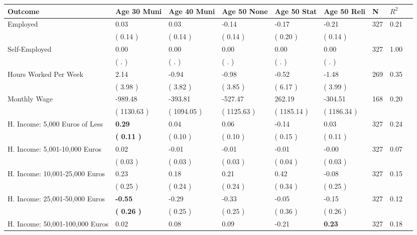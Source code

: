 \begin{tabular}{L{6.2cm} C{1.8cm} C{1.8cm} C{1.8cm} C{1.8cm} C{1.8cm} C{1.8cm} C{0.3cm} C{0.3cm}}
\toprule
 \textbf{Outcome} & \textbf{Age 30 Muni} & \textbf{Age 40 Muni} & \textbf{Age 50 None} & \textbf{Age 50 Stat} & \textbf{Age 50 Reli} & \textbf{N} & \textbf{$ R^2$} \\
\midrule
Employed &      0.03 &      0.03 &     -0.14 &     -0.17 &     -0.21  & 327 &       0.21 \\ 
 & (     0.14 ) & (     0.14 ) & (     0.14 ) & (     0.20 ) & (     0.14 )  & \\
Self-Employed &      0.00 &      0.00 &      0.00 &      0.00 &      0.00  & 327 &       1.00 \\ 
 & (        . ) & (        . ) & (        . ) & (        . ) & (        . )  & \\
Hours Worked Per Week &      2.14 &     -0.94 &     -0.98 &     -0.52 &     -1.48  & 269 &       0.35 \\ 
 & (     3.98 ) & (     3.82 ) & (     3.85 ) & (     6.17 ) & (     3.99 )  & \\
Monthly Wage &   -989.48 &   -393.81 &   -527.47 &    262.19 &   -304.51  & 168 &       0.20 \\ 
 & (  1130.63 ) & (  1094.05 ) & (  1125.63 ) & (  1185.14 ) & (  1186.34 )  & \\
H. Income: 5,000 Euros of Less & \textbf{     0.29} &      0.04 &      0.06 &     -0.14 &      0.03  & 327 &       0.24 \\ 
 & \textbf{(     0.11 )} & (     0.10 ) & (     0.10 ) & (     0.15 ) & (     0.11 )  & \\
H. Income: 5,001-10,000 Euros &      0.02 &     -0.01 &     -0.01 &     -0.01 &     -0.00  & 327 &       0.07 \\ 
 & (     0.03 ) & (     0.03 ) & (     0.03 ) & (     0.04 ) & (     0.03 )  & \\
H. Income: 10,001-25,000 Euros &      0.23 &      0.18 &      0.21 &      0.42 &     -0.08  & 327 &       0.15 \\ 
 & (     0.25 ) & (     0.24 ) & (     0.24 ) & (     0.34 ) & (     0.25 )  & \\
H. Income: 25,001-50,000 Euros & \textbf{    -0.55} &     -0.29 &     -0.33 &     -0.05 &     -0.15  & 327 &       0.12 \\ 
 & \textbf{(     0.26 )} & (     0.25 ) & (     0.25 ) & (     0.36 ) & (     0.26 )  & \\
H. Income: 50,001-100,000 Euros &      0.02 &      0.08 &      0.09 &     -0.21 & \textbf{     0.23}  & 327 &       0.18 \\ 

\end{tabular}
